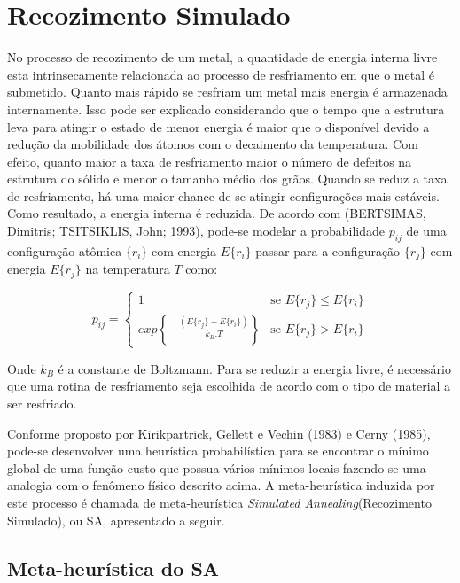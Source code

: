 \section{Recozimento Simulado}

No processo de recozimento de um metal, a quantidade de energia interna livre esta intrinsecamente
relacionada ao processo de resfriamento em que o metal é submetido. Quanto mais rápido se 
resfriam um metal mais energia é armazenada internamente. Isso pode ser explicado considerando que
o tempo que a estrutura leva para atingir o estado de menor energia é maior que o disponível devido
a redução da mobilidade dos átomos com o decaimento da temperatura. Com efeito, quanto maior a taxa de
resfriamento maior o número de defeitos na estrutura do sólido e menor o tamanho médio dos grãos.
Quando se reduz a taxa de resfriamento, há uma maior chance de se atingir configurações mais estáveis.
Como resultado, a energia interna é reduzida. De acordo com (BERTSIMAS, Dimitris; TSITSIKLIS, John; 1993),
pode-se modelar a probabilidade $p_{ij}$ de uma configuração atômica $\{r_i\}$ com energia $E\{r_i\}$ 
passar para a configuração $\{r_j\}$ com energia $E\{r_j\}$ na temperatura $T$ como:

\begin{equation}
\mbox{$p_{ij}$}=\left\{
	\begin{array}{rl}
	1 & \mbox{se $E\{r_j\} \le E\{r_i\}$} \\
	exp\left\{-\frac{(E\{r_j\}-E\{r_i\})}{k_B.T}\right\} & \mbox{se $E\{r_j\} > E\{r_i\}$}
\end{array} \right.
\end{equation}

Onde $k_B$ é a constante de Boltzmann. Para se reduzir a energia livre, é necessário que uma
rotina de resfriamento seja escolhida de acordo com o tipo de material a ser resfriado.

Conforme proposto por Kirikpartrick, Gellett e Vechin (1983) e Cerny (1985), pode-se desenvolver
uma heurística probabilística para se encontrar o mínimo global de uma função custo que possua
vários mínimos locais fazendo-se uma analogia com o fenômeno físico descrito acima. A meta-heurística
induzida por este processo é chamada de meta-heurística \textit{Simulated Annealing}(Recozimento 
Simulado), ou SA, apresentado a seguir.

\subsection{Meta-heurística do SA}

